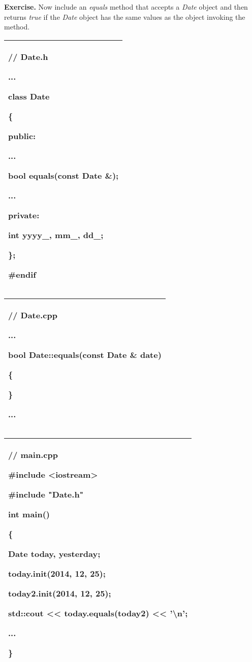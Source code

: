 \documentclass[
]{article}
\begin{document}
\textbf{Exercise.} Now include an \emph{equals} method that accepts a
\emph{Date} object and then returns \emph{true} if the \emph{Date}
object has the same values as the object invoking the method.

\begin{longtable}[]{@{}l@{}}
\toprule
\endhead
\begin{minipage}[t]{0.97\columnwidth}\raggedright
// Date.h

...

class Date

\{

public:

...

bool equals(const Date \&);

...

private:

int yyyy\_, mm\_, dd\_;

\};

\#endif\strut
\end{minipage}\tabularnewline
\bottomrule
\end{longtable}

\begin{longtable}[]{@{}l@{}}
\toprule
\endhead
\begin{minipage}[t]{0.97\columnwidth}\raggedright
// Date.cpp

...

bool Date::equals(const Date \& date)

\{

\}

...\strut
\end{minipage}\tabularnewline
\bottomrule
\end{longtable}

\begin{longtable}[]{@{}l@{}}
\toprule
\endhead
\begin{minipage}[t]{0.97\columnwidth}\raggedright
// main.cpp

\#include \textless iostream\textgreater{}

\#include "Date.h"

int main()

\{

Date today, yesterday;

today.init(2014, 12, 25);

today2.init(2014, 12, 25);

std::cout \textless\textless{} today.equals(today2) \textless\textless{}
'\textbackslash n';

...

\}\strut
\end{minipage}\tabularnewline
\bottomrule
\end{longtable}
\end{document}
